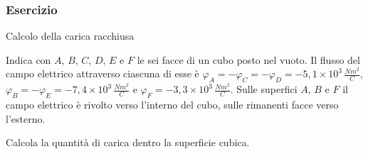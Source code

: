 \documentclass[]{beamer}
\theoremstyle{plain}
\begin{document}
\begin{frame}
\frametitle{Esercizio}

\begin{exampleblock}{Calcolo della carica racchiusa}
{\small Indica con $A$, $B$, $C$, $D$, $E$ e $F$ le sei facce di un cubo posto nel vuoto. Il flusso del campo elettrico attraverso ciascuna di esse è $\varphi_A = - \varphi_C = -\varphi_D = - 5,1 \times 10^3 \, \frac{Nm^2}{C}$, $\varphi_B = - \varphi_E = - 7,4 \times 10^3 \, \frac{Nm^2}{C}$ e $\varphi_F = - 3,3 \times 10^3 \, \frac{Nm^2}{C}$. Sulle superfici $A$, $B$ e $F$ il campo elettrico è rivolto verso l'interno del cubo, sulle rimanenti facce verso l'esterno.

Calcola la quantità di carica dentro la superficie cubica.}
\end{exampleblock}
\end{frame}
\end{document}
